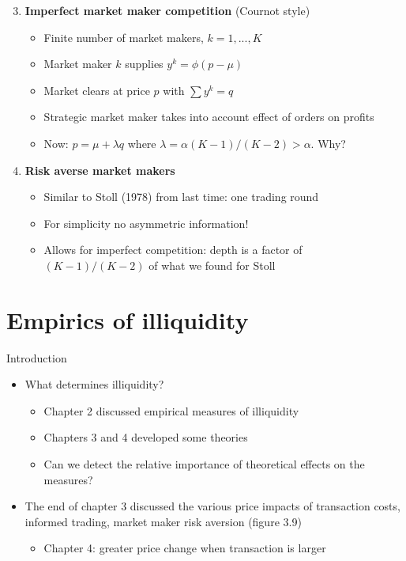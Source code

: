 \documentclass[english,10pt
,aspectratio=169
]{beamer}
\begin{document}
\begin{frame}{}
	\begin{enumerate}
		\setcounter{enumi}{2}
		\item \textbf{Imperfect market maker competition} (Cournot style)
		\begin{itemize}
			\item Finite number of market makers, $k=1,..., K$
			\item Market maker $k$ supplies $y^k=\phi(p-\mu)$
			\item Market clears at price $p$ with $\sum y^k = q$
			\item Strategic market maker takes into account effect of orders on profits
			\item Now: $p=\mu+\lambda q$ where $\lambda = \alpha (K-1)/(K-2) > \alpha$. Why? 
			\pause {}
		\end{itemize}
		\pause
		\item \textbf{Risk averse market makers}
		\begin{itemize}
			\item Similar to Stoll (1978) from last time: one trading round
			\item For simplicity no asymmetric information!
			\item Allows for imperfect competition: depth is a factor of $(K-1)/(K-2)$ of what we found for Stoll
		\end{itemize}
	\end{enumerate}
\end{frame}



\section{Empirics of illiquidity}

\begin{frame}{Introduction}
	\begin{itemize}
		\item What determines illiquidity?
		\begin{itemize}
			\item Chapter 2 discussed empirical measures of illiquidity
			\item Chapters 3 and 4 developed some theories
			\item Can we detect the relative importance of theoretical effects on the measures?
		\end{itemize}
		\item The end of chapter 3 discussed the various price impacts of transaction costs, informed trading, market maker risk aversion (figure 3.9)
		\begin{itemize}
			\item Chapter 4: greater price change when transaction is larger
		\end{itemize}
	\end{itemize}
\end{frame}
\end{document}
